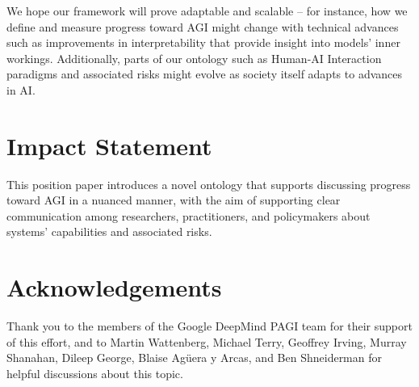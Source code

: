 \documentclass{article}
\theoremstyle{plain}
\theoremstyle{definition}
\theoremstyle{remark}
\begin{document}
We hope our framework will prove adaptable and scalable -- for instance, how we define and measure progress toward AGI might change with technical advances such as improvements in interpretability that provide insight into models' inner workings. Additionally, parts of our ontology such as Human-AI Interaction paradigms and associated risks might evolve as society itself adapts to advances in AI. 

\section*{Impact Statement}
This position paper introduces a novel ontology that supports discussing progress toward AGI in a nuanced manner, with the aim of supporting clear communication among researchers, practitioners, and policymakers about systems' capabilities and associated risks. 

\section*{Acknowledgements}

Thank you to the members of the Google DeepMind PAGI team for their support of this effort, and to Martin Wattenberg, Michael Terry, Geoffrey Irving, Murray Shanahan, Dileep George, Blaise Agüera y Arcas, and Ben Shneiderman for helpful discussions about this topic. 












\end{document}
